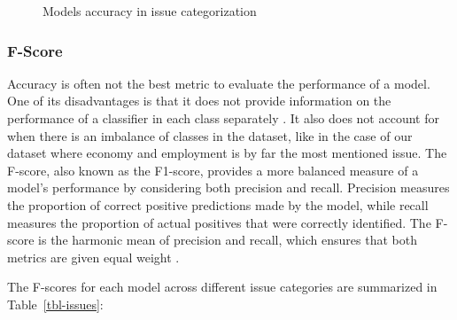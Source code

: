 \documentclass[
  authoryear,
  preprint,
  3p]{elsarticle}
\begin{document}
\begin{figure}


\caption{\label{fig-accuracy}Models accuracy in issue categorization}

\end{figure}%

\subsubsection{F-Score}\label{f-score}

Accuracy is often not the best metric to evaluate the performance of a
model. One of its disadvantages is that it does not provide information
on the performance of a classifier in each class separately
\citep{obi23}. It also does not account for when there is an imbalance
of classes in the dataset, like in the case of our dataset where economy
and employment is by far the most mentioned issue. The F-score, also
known as the F1-score, provides a more balanced measure of a model's
performance by considering both precision and recall. Precision measures
the proportion of correct positive predictions made by the model, while
recall measures the proportion of actual positives that were correctly
identified. The F-score is the harmonic mean of precision and recall,
which ensures that both metrics are given equal weight
\citep{christen_etal24}.

The F-scores for each model across different issue categories are
summarized in Table~\ref{tbl-issues}:
\end{document}
